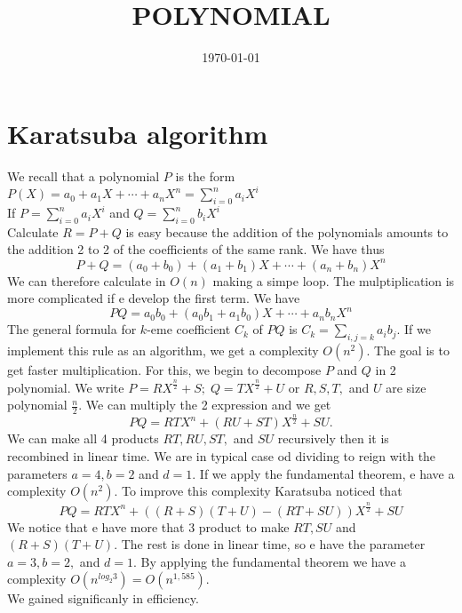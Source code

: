 \documentclass[a4paper, 12pt]{article}
\date{\today}
\author{}
\title{POLYNOMIAL}
\begin{document}
\maketitle
\section*{Karatsuba algorithm}
We recall that a polynomial $P$ is the form $P(X) = a_{0} + a_{1} X + \cdots + a_{n} X^{n} = \sum_{i=0}^{n} a_{i}X^{i}$\\
If $P = \sum_{i=0}^{n} a_{i}X^{i}$ and $Q = \sum_{i=0}^{n} b_{i}X^{i}$\\
Calculate $R = P + Q$ is easy because the addition of the polynomials amounts to the addition 2 to 2 of the coefficients of the same rank. We have thus $$P + Q = (a_{0}+b_{0}) + (a_{1}+b_{1})X + \cdots + (a_{n}+b_{n})X^{n}$$
We can therefore calculate in $O(n)$ making a simpe loop. The mulptiplication is more complicated if e develop the first term. We have $$PQ = a_{0}b_{0}+ (a_{0}b_{1}+a_{1}b_{0})X + \cdots + a_{n}b_{n}X^{n}$$
The general formula for $k$-eme coefficient $C_{k}$ of $PQ$ is $C_{k} = \sum_{i,j=k} a_{i}b_{j}$. If we implement this rule as an algorithm, we get a complexity $O(n^{2})$. The goal is to get faster multiplication. For this, we begin to decompose $P$ and $Q$ in 2 polynomial. We write $P = R X^{\frac{n}{2}}+S; \; Q = T X^{\frac{n}{2}}+U$ or $R, S, T,$ and $U$ are size polynomial $\frac{n}{2}$. We can multiply the 2 expression and we get $$PQ = RTX^{n} + (RU + ST)X^{\frac{n}{2}} + SU.$$
We can make all 4 products $RT, RU, ST,$ and $SU$ recursively then it is recombined in linear time. We are in typical case od dividing to reign with the parameters $a=4, b= 2$ and $d=1$. If we apply the fundamental theorem, e have a complexity $O(n^{2})$. To improve this complexity Karatsuba noticed that $$PQ = RTX^{n} + ((R+S)(T+U) - (RT + SU))X^{\frac{n}{2}} + SU$$
We notice that e have more that 3 product to make $RT, SU$ and $(R+S)(T+U)$. The rest is done in linear time, so e have the parameter $a = 3, b = 2,$ and $d=1$. By applying the fundamental theorem we have a complexity $O(n^{log_{2}3}) = O(n^{1,585})$.\\ We gained significanly in efficiency.
\end{document}
